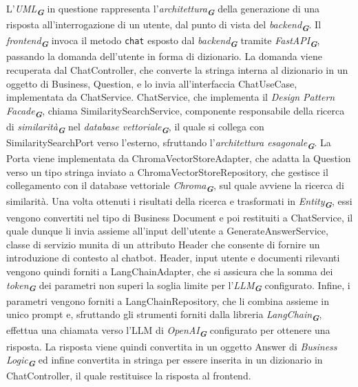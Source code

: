 L'\emph{UML}\textsubscript{\textbf{\textit{G}}} in questione rappresenta l'\emph{architettura}\textsubscript{\textbf{\textit{G}}} della generazione di una risposta all'interrogazione di un utente, dal punto di vista del \emph{backend}\textsubscript{\textbf{\textit{G}}}.
Il \emph{frontend}\textsubscript{\textbf{\textit{G}}} invoca il metodo \texttt{chat} esposto dal \emph{backend}\textsubscript{\textbf{\textit{G}}} tramite \emph{FastAPI}\textsubscript{\textbf{\textit{G}}}, passando la domanda dell'utente in forma di dizionario.
La domanda viene recuperata dal ChatController, che converte la stringa interna al dizionario in un oggetto di Business, Question, e lo invia all'interfaccia ChatUseCase, implementata da ChatService.
ChatService, che implementa il \emph{Design Pattern} \emph{Facade}\textsubscript{\textbf{\textit{G}}}, chiama SimilaritySearchService, componente responsabile della ricerca di \emph{similarità}\textsubscript{\textbf{\textit{G}}} nel \emph{database vettoriale}\textsubscript{\textbf{\textit{G}}}, il quale si collega con SimilaritySearchPort verso l'esterno, sfruttando l'\emph{architettura esagonale}\textsubscript{\textbf{\textit{G}}}. La Porta viene implementata da ChromaVectorStoreAdapter, che adatta la Question verso un tipo stringa inviato a ChromaVectorStoreRepository, che gestisce il collegamento con il database vettoriale \emph{Chroma}\textsubscript{\textbf{\textit{G}}}, sul quale avviene la ricerca di similarità. Una volta ottenuti i risultati della ricerca e trasformati in \emph{Entity}\textsubscript{\textbf{\textit{G}}}, essi vengono convertiti nel tipo di Business Document e poi restituiti a ChatService, il quale dunque li invia assieme all'input dell'utente a GenerateAnswerService, classe di servizio munita di un attributo Header che consente di fornire un introduzione di contesto al chatbot. Header, input utente e documenti rilevanti vengono quindi forniti a LangChainAdapter, che si assicura che la somma dei \emph{token}\textsubscript{\textbf{\textit{G}}} dei parametri non superi la soglia limite per l'\emph{LLM}\textsubscript{\textbf{\textit{G}}} configurato. Infine, i parametri vengono forniti a LangChainRepository, che li combina assieme in unico prompt e, sfruttando gli strumenti forniti dalla libreria \emph{LangChain}\textsubscript{\textbf{\textit{G}}}, effettua una chiamata verso l'LLM di \emph{OpenAI}\textsubscript{\textbf{\textit{G}}} configurato per ottenere una risposta. 
La risposta viene quindi convertita in un oggetto Answer di \emph{Business Logic}\textsubscript{\textbf{\textit{G}}} ed infine convertita in stringa per essere inserita in un dizionario in ChatController, il quale restituisce la risposta al frontend.

